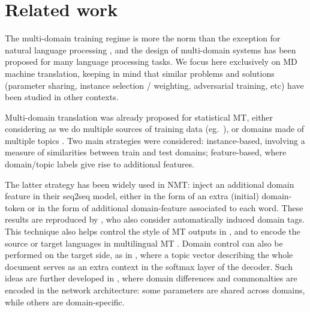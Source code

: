 \documentclass[11pt,a4paper]{article}
\newcommand{\fyDone}[1]{\done[FY]\Todo[FY:]{\textcolor{orange}{#1}}}
\begin{document}
\section{Related work \label{sec:related}}

The multi-domain training regime is more the norm than the exception for natural language processing \cite{Dredze08online,Finkel09hierarchical}, and the design of multi-domain systems has been proposed for many language processing tasks. We focus here exclusively on MD machine translation, keeping in mind that similar problems and solutions (parameter sharing, instance selection / weighting, adversarial training, etc) have been studied in other contexts.

Multi-domain translation was already proposed for statistical MT, either considering as we do multiple sources of training data (eg.\ \cite{Banerjee10combining,Clark12onesystem,Sennrich13multidomain,Huck15mixeddomain}), or domains made of multiple topics\fyDone{you mean multiple topics?} \cite{Eidelman12topic,Hasler14dynamic-topic}.\fyDone{Add also topic models refs} Two main strategies were considered: instance-based, involving a measure of similarities between train and test domains; feature-based, where domain/topic labels give rise to additional features. 

The latter strategy has been widely used in NMT:  inject an additional domain feature in their seq2seq model, either in the form of an extra (initial) domain-token or in the form of additional domain-feature associated to each word. These results are reproduced by , who also consider automatically induced domain tags. This technique also helps control the style of MT outputs in \cite{Sennrich16politeness,Niu18multitask}, and to encode the source or target languages in multilingual MT \cite{Firat16multiway,Johnson17google}. Domain control can also be performed on the target side, as in \cite{Chen16guided}, where a topic vector describing the whole document serves as an extra context in the softmax layer of the decoder. Such ideas are further developed in \cite{Chu18multilingual,Pham19generic}, where domain differences and commonalties are encoded in the network architecture: some parameters are shared across domains, while others are domain-specific. %
\end{document}
